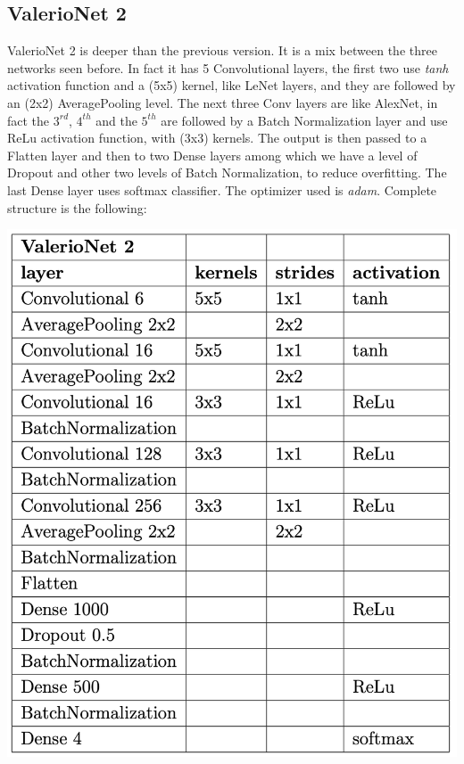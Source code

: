 \documentclass[12pt]{article}
\begin{document}
\subsection{ValerioNet 2}
ValerioNet 2 is deeper than the previous version. It is a mix between the three networks seen before. In fact it has 5 Convolutional layers, the first two use {\em tanh} activation function and a (5x5) kernel, like LeNet layers, and they are followed by an (2x2) AveragePooling level. The next three Conv layers are like AlexNet, in fact the $3^{rd}$, $4^{th}$ and the $5^{th}$ are followed by a Batch Normalization layer and use ReLu activation function, with (3x3) kernels. The output is then passed to a Flatten layer and then to two Dense layers among which we have a level of Dropout and other two levels of Batch Normalization, to reduce overfitting. The last Dense layer uses softmax classifier. The optimizer used is {\em adam}. Complete structure is the following:

\bigskip
\begin{minipage}[c]{.5\textwidth}
   \centering
   \includegraphics[width=\textwidth]{pic3}
\end{minipage}
\bigskip
\end{document}
